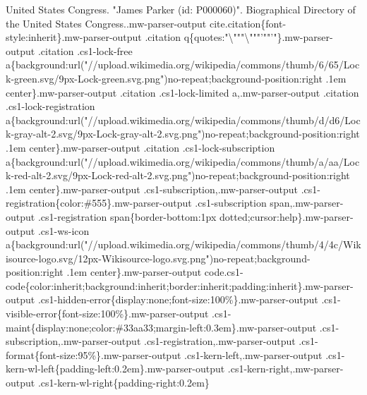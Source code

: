 United States Congress. "James Parker (id: P000060)". Biographical
Directory of the United States Congress..mw-parser-output
cite.citation\{font-style:inherit\}.mw-parser-output .citation
q\{quotes:"\textbackslash{}"""\textbackslash{}"""'""'"\}.mw-parser-output
.citation .cs1-lock-free
a\{background:url("//upload.wikimedia.org/wikipedia/commons/thumb/6/65/Lock-green.svg/9px-Lock-green.svg.png")no-repeat;background-position:right
.1em center\}.mw-parser-output .citation .cs1-lock-limited
a,.mw-parser-output .citation .cs1-lock-registration
a\{background:url("//upload.wikimedia.org/wikipedia/commons/thumb/d/d6/Lock-gray-alt-2.svg/9px-Lock-gray-alt-2.svg.png")no-repeat;background-position:right
.1em center\}.mw-parser-output .citation .cs1-lock-subscription
a\{background:url("//upload.wikimedia.org/wikipedia/commons/thumb/a/aa/Lock-red-alt-2.svg/9px-Lock-red-alt-2.svg.png")no-repeat;background-position:right
.1em center\}.mw-parser-output .cs1-subscription,.mw-parser-output
.cs1-registration\{color:\#555\}.mw-parser-output .cs1-subscription
span,.mw-parser-output .cs1-registration span\{border-bottom:1px
dotted;cursor:help\}.mw-parser-output .cs1-ws-icon
a\{background:url("//upload.wikimedia.org/wikipedia/commons/thumb/4/4c/Wikisource-logo.svg/12px-Wikisource-logo.svg.png")no-repeat;background-position:right
.1em center\}.mw-parser-output
code.cs1-code\{color:inherit;background:inherit;border:inherit;padding:inherit\}.mw-parser-output
.cs1-hidden-error\{display:none;font-size:100\%\}.mw-parser-output
.cs1-visible-error\{font-size:100\%\}.mw-parser-output
.cs1-maint\{display:none;color:\#33aa33;margin-left:0.3em\}.mw-parser-output
.cs1-subscription,.mw-parser-output .cs1-registration,.mw-parser-output
.cs1-format\{font-size:95\%\}.mw-parser-output
.cs1-kern-left,.mw-parser-output
.cs1-kern-wl-left\{padding-left:0.2em\}.mw-parser-output
.cs1-kern-right,.mw-parser-output
.cs1-kern-wl-right\{padding-right:0.2em\}
